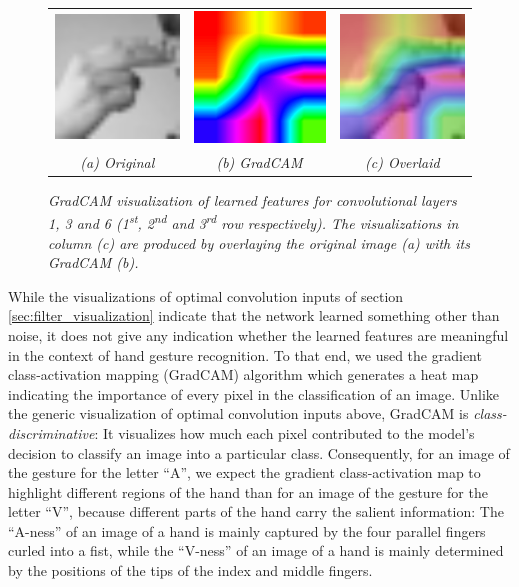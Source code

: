 \documentclass[a4paper]{article}
\newcommand{\ts}{\textsuperscript}
\begin{document}
\begin{figure}[t]
\begin{tabular}{ccc}
          \includegraphics[width=.25\linewidth]{graphics/gradcam/layer6/1_original}&\includegraphics[width=.25\linewidth]{graphics/gradcam/layer6/1_map}&\includegraphics[width=.25\linewidth]{graphics/gradcam/layer6/1_overlaid} \\
          \textit{(a) Original} & \textit{(b) GradCAM} & \textit{(c) Overlaid}
     \end{tabular}
     \caption{\textit{GradCAM visualization of learned features for convolutional layers 1, 3 and 6 (1\ts{st}, 2\ts{nd} and 3\ts{rd} row respectively). The visualizations in column (c) are produced by overlaying the original image (a) with its GradCAM (b).}}
     \label{fig:gradcam}
\end{figure}
While the visualizations of optimal convolution inputs of section \ref{sec:filter_visualization} indicate that the network learned something other than noise, it does not give any indication whether the learned features are meaningful in the context of hand gesture recognition. To that end, we used the gradient class-activation mapping (GradCAM) algorithm \cite{Selvaraju2016} which generates a heat map indicating the importance of every pixel in the classification of an image. Unlike the generic visualization of optimal convolution inputs above, GradCAM is \textit{class-discriminative}: It visualizes how much each pixel contributed to the model's decision to classify an image into a particular class. Consequently, for an image of the gesture for the letter \enquote{A}, we expect the gradient class-activation map to highlight different regions of the hand than for an image of the gesture for the letter \enquote{V}, because different parts of the hand carry the salient information: The \enquote{A-ness} of an image of a hand is mainly captured by the four parallel fingers curled into a fist, while the \enquote{V-ness} of an image of a hand is mainly determined by the positions of the tips of the index and middle fingers.\\
\end{document}
